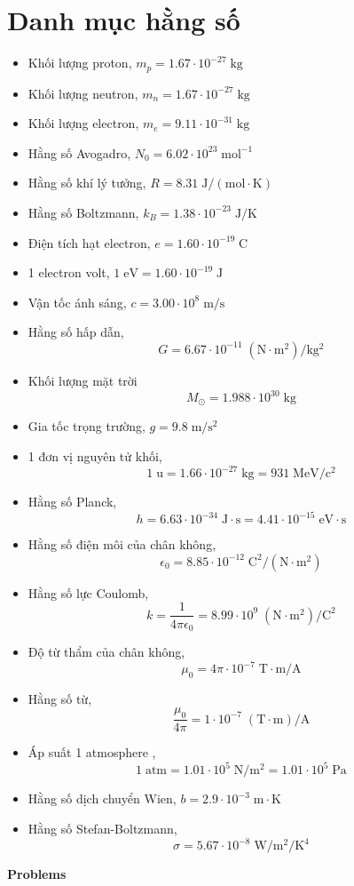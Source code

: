 \documentclass[11pt]{article}
\begin{document}
\section*{Danh mục hằng số}
\begin{multicols}{2}
\begin{itemize}
    \item Khối lượng proton, $m_p = 1.67\cdot 10^{-27}\;\mathrm{kg}$
    \item Khối lượng neutron, $m_n = 1.67 \cdot 10^{-27}\;\mathrm{kg}$
    \item Khối lượng electron, $m_e = 9.11 \cdot 10^{-31}\;\mathrm{kg}$
    \item Hằng số Avogadro, $N_0 = 6.02 \cdot 10^{23}\;\mathrm{mol^{-1}}$
    \item Hằng số khí lý tưởng, $R = 8.31\;\mathrm{J/(mol\cdot K)}$
    \item Hằng số Boltzmann, $k_B = 1.38\cdot 10^{-23}\;\mathrm{J/K}$
    \item Điện tích hạt electron, $e = 1.60 \cdot 10^{-19}\;\mathrm{C}$
    \item 1 electron volt, $1\;\mathrm{eV} = 1.60\cdot 10^{-19}\;\mathrm{J}$
    \item Vận tốc ánh sáng, $c = 3.00 \cdot 10^8\;\mathrm{m/s}$
    \item Hằng số hấp dẫn, \[G = 6.67\cdot 10^{-11}\;\mathrm{(N\cdot m^2)/kg^2}\]
    \item Khối lượng mặt trời
    \[M_{\odot} = 1.988\cdot 10^{30}\;\mathrm{kg}\]
    \item Gia tốc trọng trường, $g = 9.8\;\mathrm{m/s^2}$
    \item 1 đơn vị nguyên tử khối, \[1\;\mathrm{u} = 1.66 \cdot 10^{-27}\;\mathrm{kg} = 931\;\mathrm{MeV/c^2}\]
    \item Hằng số Planck, 
        \[h = 6.63 \cdot 10^{-34}\;\mathrm{J\cdot s} = 4.41\cdot 10^{-15}\;\mathrm{eV\cdot s}\]
    \item Hằng số điện môi của chân không, \[\epsilon_0 = 8.85 \cdot 10^{-12}\;\mathrm{C^2/(N\cdot m^2)}\]
    \item Hằng số lực Coulomb,
    \[k = \frac{1}{4\pi\epsilon_0} = 8.99 \cdot 10^9\;\mathrm{(N\cdot m^2)/C^2}\]
    \item Độ từ thẩm của chân không, \[\mu_0 = 4\pi\cdot 10^{-7}\;\mathrm{T\cdot m/A}\]
    \item Hằng số từ, 
    \[ \frac{\mu_0}{4\pi} = 1\cdot 10^{-7}\;\mathrm{(T\cdot m)/A}\]
    \item Áp suất 1 atmosphere ,
    \[1\;\mathrm{atm} = 1.01 \cdot 10^5\;\mathrm{N/m^2} = 1.01\cdot 10^5\;\mathrm{Pa}\]
    \item Hằng số dịch chuyển Wien, $b = 2.9\cdot 10^{-3}\;\mathrm{m\cdot K}$
    \item Hằng số Stefan-Boltzmann, \[\sigma = 5.67\cdot 10^{-8}\;\mathrm{W/m^2/K^4}\]
\end{itemize}
\end{multicols}
\newpage
\normalsize
\begin{center}
    \Large 
    \textbf{Problems}
\end{center}
\end{document}
